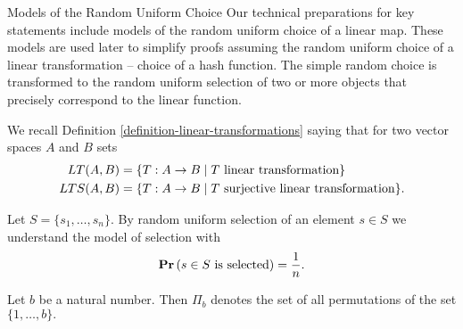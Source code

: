 \begin{section}{Models of the Random Uniform Choice}
Our technical preparations for key statements include models of the random uniform choice of a linear map. These models are used later to simplify proofs assuming the random uniform choice of a linear transformation -- choice of a hash function. The simple random choice is transformed to the random uniform selection of two or more objects that precisely correspond to the linear function.

We recall Definition \ref{definition-linear-transformations} saying that for two vector spaces $A$ and $B$ sets 
\[
\begin{split}
LT(A, B) & = \{ T: A \rightarrow B \mid T \text{ linear transformation} \} \\
LTS(A, B) & = \{ T: A \rightarrow B \mid T \text{ surjective linear transformation} \} \text{.}
\end{split}
\]

\begin{definition}
Let $S = \{ s_1, \dots, s_n \}$. By random uniform selection of an element $s \in S$ we understand the model of selection with
\[
	\mathbf{Pr}\left(s \in S \text{ is selected}\right) = \frac{1}{n} \text{.}
\]
\end{definition}

\begin{definition}
Let $b$ be a natural number. Then $\Pi_b$ denotes the set of all permutations of the set $\{1, \dots, b\}.$
\end{definition}


\end{section}
